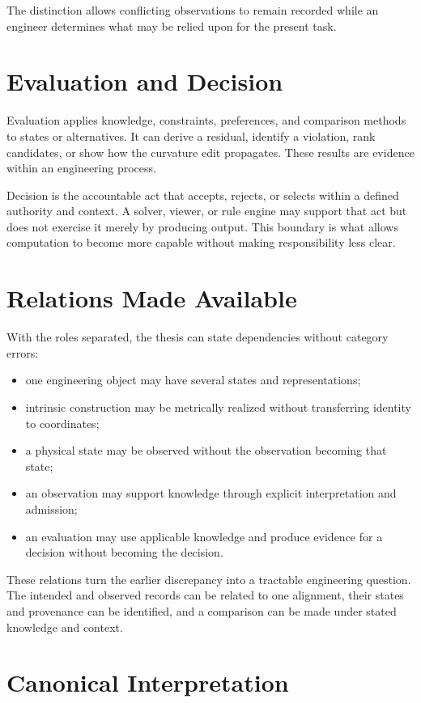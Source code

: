 The distinction allows conflicting observations to remain recorded while an
engineer determines what may be relied upon for the present task.

\section{Evaluation and Decision}

Evaluation applies knowledge, constraints, preferences, and comparison methods
to states or alternatives. It can derive a residual, identify a violation, rank
candidates, or show how the curvature edit propagates. These results are
evidence within an engineering process.

Decision is the accountable act that accepts, rejects, or selects within a
defined authority and context. A solver, viewer, or rule engine may support that
act but does not exercise it merely by producing output. This boundary is what
allows computation to become more capable without making responsibility less
clear.

\section{Relations Made Available}

With the roles separated, the thesis can state dependencies without category
errors:

\begin{itemize}
\item one engineering object may have several states and representations;
\item intrinsic construction may be metrically realized without transferring
  identity to coordinates;
\item a physical state may be observed without the observation becoming that
  state;
\item an observation may support knowledge through explicit interpretation and
  admission;
\item an evaluation may use applicable knowledge and produce evidence for a
  decision without becoming the decision.
\end{itemize}

These relations turn the earlier discrepancy into a tractable engineering
question. The intended and observed records can be related to one alignment,
their states and provenance can be identified, and a comparison can be made
under stated knowledge and context.

\section{Canonical Interpretation}

